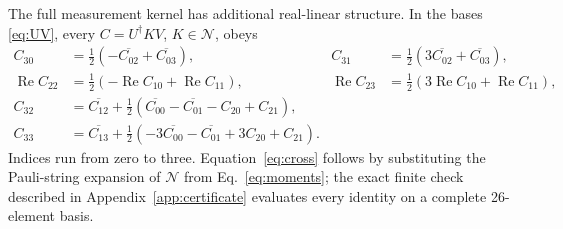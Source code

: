 \documentclass[aps,pra,reprint,onecolumn,superscriptaddress]{revtex4-2}
\newcommand{\NN}{\mathcal N}
\begin{document}
The full measurement kernel has additional real-linear structure. In the bases \eqref{eq:UV}, every \(C=U^\dagger K V\), \(K\in\NN\), obeys
\begin{align}
 C_{30}&=\tfrac12(-\overline{C_{02}}+\overline{C_{03}}),&
 C_{31}&=\tfrac12(3\overline{C_{02}}+\overline{C_{03}}),\nonumber\\
 \operatorname{Re}C_{22}&=\tfrac12(-\operatorname{Re}C_{10}+\operatorname{Re}C_{11}),&
 \operatorname{Re}C_{23}&=\tfrac12(3\operatorname{Re}C_{10}+\operatorname{Re}C_{11}),\nonumber\\
 C_{32}&=\overline{C_{12}}+
 \tfrac12(\overline{C_{00}}-\overline{C_{01}}-C_{20}+C_{21}),\nonumber\\
 C_{33}&=\overline{C_{13}}+
 \tfrac12(-3\overline{C_{00}}-\overline{C_{01}}+3C_{20}+C_{21}).
 \label{eq:cross}
\end{align}
Indices run from zero to three. Equation~\eqref{eq:cross} follows by substituting the Pauli-string expansion of \(\NN\) from Eq.~\eqref{eq:moments}; the exact finite check described in Appendix~\ref{app:certificate} evaluates every identity on a complete 26-element basis.
\end{document}
